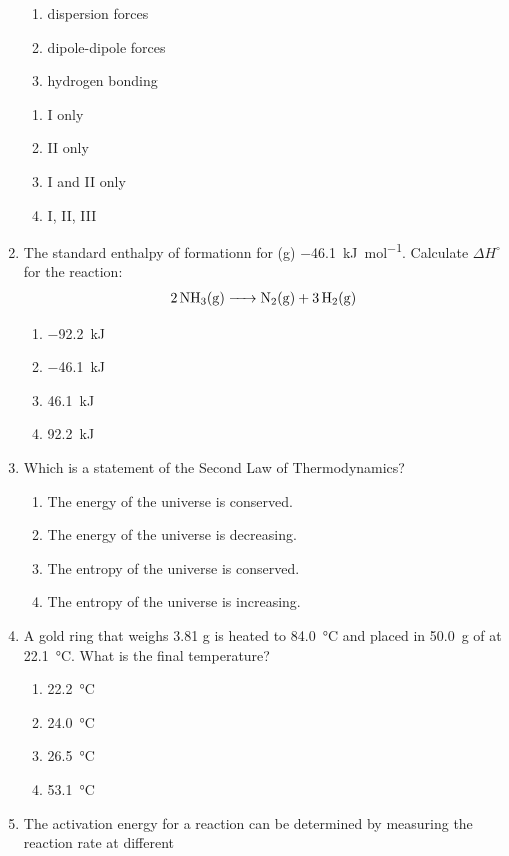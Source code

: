 \documentclass[11pt, leqno]{article}
\newcommand{\standard}{^\circ}
\begin{document}
\begin{enumerate}[leftmargin = *]
\begin{enumerate}[I]
    \item dispersion forces
    \item dipole-dipole forces
    \item hydrogen bonding
\end{enumerate}
\begin{enumerate}
    \item I only
    \item II only
    \item I and II only
    \item I, II, III
\end{enumerate}
\item The standard enthalpy of formationn for (g) \SI{-46.1}{\kilo\joule\per\mole}. Calculate $\Delta{H}\standard$ for the reaction: 
\begin{align*}
    \ce{2NH3(g) -> N2(g) + 3H2(g)}
\end{align*}
\begin{enumerate}
    \item \SI{-92.2}{\kilo\joule}
    \item \SI{-46.1}{\kilo\joule}
    \item \SI{46.1}{\kilo\joule}
    \item \SI{92.2}{\kilo\joule}
\end{enumerate}
\newpage
\item Which is a statement of the Second Law of Thermodynamics?
\begin{enumerate}
    \item The energy of the universe is conserved.
    \item The energy of the universe is decreasing.
    \item The entropy of the universe is conserved.
    \item The entropy of the universe is increasing.
\end{enumerate}
\item A gold ring that weighs 3.81 g is heated to \SI{84.0}{\celsius} and placed in \SI{50.0}{\gram} of  at \SI{22.1}{\celsius}. What is the final temperature?
\begin{enumerate}
    \item \SI{22.2}{\celsius}
    \item \SI{24.0}{\celsius}
    \item \SI{26.5}{\celsius}
    \item \SI{53.1}{\celsius}
\end{enumerate}
\item The activation energy for a reaction can be determined by measuring the reaction rate at different 

\end{enumerate}
\end{document}
